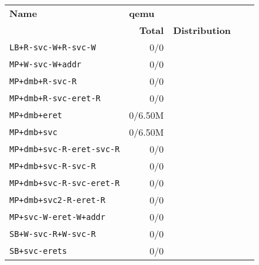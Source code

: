 \begin{tabular}{l  | r r l l}
   \textbf{Name}                  & \multicolumn{3}{l}{\textbf{qemu}}        & \\
                                  & \textbf{Total} & \textbf{Distribution} &  & \\
        \verb|LB+R-svc-W+R-svc-W| &            0/0 &                       &  & \\ \hline 
           \verb|MP+W-svc-W+addr| &            0/0 &                       &  & \\ \hline 
            \verb|MP+dmb+R-svc-R| &            0/0 &                       &  & \\ \hline 
       \verb|MP+dmb+R-svc-eret-R| &            0/0 &                       &  & \\ \hline 
               \verb|MP+dmb+eret| &        0/6.50M &                       &  & \\ \hline 
                \verb|MP+dmb+svc| &        0/6.50M &                       &  & \\ \hline 
   \verb|MP+dmb+svc-R-eret-svc-R| &            0/0 &                       &  & \\ \hline 
        \verb|MP+dmb+svc-R-svc-R| &            0/0 &                       &  & \\ \hline 
   \verb|MP+dmb+svc-R-svc-eret-R| &            0/0 &                       &  & \\ \hline 
      \verb|MP+dmb+svc2-R-eret-R| &            0/0 &                       &  & \\ \hline 
      \verb|MP+svc-W-eret-W+addr| &            0/0 &                       &  & \\ \hline 
        \verb|SB+W-svc-R+W-svc-R| &            0/0 &                       &  & \\ \hline 
              \verb|SB+svc-erets| &            0/0 &                       &  & \\ \hline 
\end{tabular}

